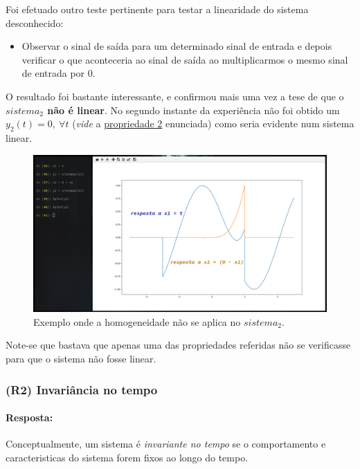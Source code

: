 \clearpage
Foi efetuado outro teste pertinente para testar a linearidade do sistema desconhecido: 
\begin{itemize}
    \item Observar o sinal de saída para um determinado sinal de entrada e depois verificar o que aconteceria ao sinal de saída ao multiplicarmos o mesmo sinal de entrada por \(0\).
\end{itemize}

O resultado foi bastante interessante, e confirmou mais uma vez a tese de que o \textbf{\(sistema_2\) não é linear}\footnotemark[1]. No segundo instante da experiência não foi obtido um \(y_2(t) = 0,\ \forall t\) (\textit{vide} a \hyperref[propriedade:2]{propriedade 2} enunciada) como seria evidente num sistema linear.

\begin{figure}[ht]
    \centering
    \includegraphics[width = 0.5\linewidth]{prints/linearidade3.png}
    \caption{Exemplo onde a homogeneidade não se aplica no \(sistema_2\).}
    \label{fig:homogeneidade}
\end{figure}
 
Note-se que bastava que apenas uma das propriedades referidas não se verificasse para que o sistema não fosse linear.


\clearpage
\subsubsection{(R2) Invariância no tempo}
\label{subsubsec:R2}
\paragraph{Resposta:} %
Conceptualmente, um sistema é \textit{invariante no tempo} se o comportamento e caracteristicas do sistema forem fixos ao longo do tempo.

